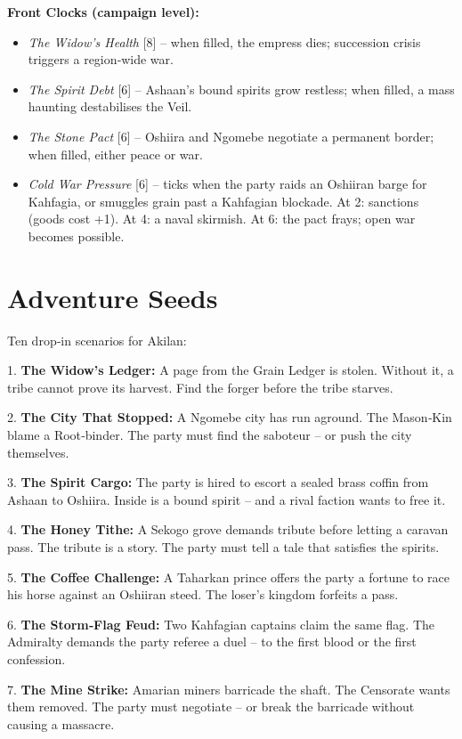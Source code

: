 \documentclass[11pt]{book}
\begin{document}
\textbf{Front Clocks (campaign level):}
\begin{itemize}
\item \emph{The Widow's Health} [8] -- when filled, the empress dies; succession crisis triggers a region‑wide war.
\item \emph{The Spirit Debt} [6] -- Ashaan's bound spirits grow restless; when filled, a mass haunting destabilises the Veil.
\item \emph{The Stone Pact} [6] -- Oshiira and Ngomebe negotiate a permanent border; when filled, either peace or war.
\item \emph{Cold War Pressure} [6] -- ticks when the party raids an Oshiiran barge for Kahfagia, or smuggles grain past a Kahfagian blockade. At 2: sanctions (goods cost +1). At 4: a naval skirmish. At 6: the pact frays; open war becomes possible.
\end{itemize}

\chapter{Adventure Seeds}

Ten drop‑in scenarios for Akilan:

1. \textbf{The Widow's Ledger:} A page from the Grain Ledger is stolen. Without it, a tribe cannot prove its harvest. Find the forger before the tribe starves.

2. \textbf{The City That Stopped:} A Ngomebe city has run aground. The Mason‑Kin blame a Root‑binder. The party must find the saboteur -- or push the city themselves.

3. \textbf{The Spirit Cargo:} The party is hired to escort a sealed brass coffin from Ashaan to Oshiira. Inside is a bound spirit -- and a rival faction wants to free it.

4. \textbf{The Honey Tithe:} A Sekogo grove demands tribute before letting a caravan pass. The tribute is a story. The party must tell a tale that satisfies the spirits.

5. \textbf{The Coffee Challenge:} A Taharkan prince offers the party a fortune to race his horse against an Oshiiran steed. The loser's kingdom forfeits a pass.

6. \textbf{The Storm‑Flag Feud:} Two Kahfagian captains claim the same flag. The Admiralty demands the party referee a duel -- to the first blood or the first confession.

7. \textbf{The Mine Strike:} Amarian miners barricade the shaft. The Censorate wants them removed. The party must negotiate -- or break the barricade without causing a massacre.
\end{document}
